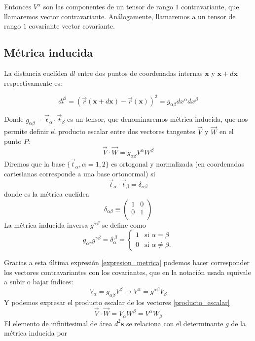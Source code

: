 Entonces $V^{\alpha}$ son las componentes de un tensor de rango $1$
contravariante, que llamaremos vector contravariante. Análogamente,
llamaremos a un tensor de rango $1$ covariante vector covariante.
 
\subsection{Métrica inducida}

La distancia euclídea $dl$ entre dos puntos de coordenadas internas
$\mathbf{x}$ y $\mathbf{x}+d\mathbf{x}$ respectivamente es:

\begin{equation}\label{elemento_linea}
dl^2=(\vec{r}(\mathbf{x}+d\mathbf{x})-\vec{r}(\mathbf{x}))^2=g_{\alpha\beta}dx^{\alpha}dx^{\beta}
\end{equation}

Donde $g_{\alpha\beta}=\vec{t}_{\alpha}\cdot\vec{t}_{\beta}$ es un tensor, que
denominaremos métrica inducida, que nos permite definir el producto escalar
entre dos vectores tangentes $\vec{V}$ y $\vec{W}$ en el punto $P$:
\begin{equation}\label{producto_escalar}
\vec{V}\cdot\vec{W}=g_{\alpha\beta}V^{\alpha}W^{\beta}
\end{equation}
Diremos que la base $\{ \vec{t}_{\alpha}, \alpha=1,2\}$ es ortogonal y
normalizada (en coordenadas cartesianas corresponde a una base ortonormal) si
\begin{equation*}
\vec{t}_{\alpha}\cdot\vec{t}_{\beta}=\delta_{\alpha\beta}
\end{equation*}
donde es la métrica euclídea
\begin{equation*}
\delta_{\alpha\beta}\equiv\left(\begin{array}{cc}
1&0\\
0&1\\
\end{array}\right)
\end{equation*}
La métrica inducida inversa $g^{\alpha\beta}$ se define como
\begin{equation}\label{expresion_metrica}
g_{\alpha\gamma}g^{\gamma\beta}=\delta_{\alpha}^{\ \beta}=\begin{cases}
1&\text{si $\alpha=\beta$}\\
0&\text{si $\alpha\neq\beta$}.
\end{cases}
\end{equation}

Gracias a esta última expresión \eqref{expresion_metrica} podemos hacer
corresponder los vectores contravariantes con los covariantes, que en la
notación usada equivale a subir o bajar índices:
\begin{equation*}
V_{\alpha}=g_{\alpha\beta}V^{\beta}\rightarrow V^{\alpha}=g^{\alpha\beta}V_{\beta} 
\end{equation*}
Y podemos expresar el producto escalar de los vectores
\eqref{producto_escalar} 
\begin{equation*}
\vec{V}\cdot\vec{W}=V_{\alpha}W^{\beta}=V^{\alpha}W_{\beta}
\end{equation*}
El elemento de infinitesimal de área $d^2\mathbf{s}$ se relaciona con el
determinante $g$ de la métrica inducida por

